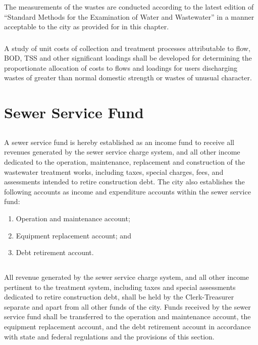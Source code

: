 \subsubsection{}
The measurements of the wastes are conducted according to the latest edition of “Standard Methods for the Examination of Water and Wastewater” in a manner acceptable to the city as provided for in this chapter.
\subsubsection{}
A study of unit costs of collection and treatment processes attributable to flow, BOD, TSS and other significant loadings shall be developed for determining the proportionate allocation of costs to flows and loadings for users discharging wastes of greater than normal domestic strength or wastes of unusual character.

\section{Sewer Service Fund}
\subsection{}
A sewer service fund is hereby established as an income fund to receive all revenues generated by the sewer service charge system, and all other income dedicated to the operation, maintenance, replacement and construction of the wastewater treatment works, including taxes, special charges, fees, and assessments intended to retire construction debt.  The city also establishes the following accounts as income and expenditure accounts within the sewer service fund:
\begin{enumerate}
\item Operation and maintenance account;
\item Equipment replacement account; and
\item Debt retirement account.
\end{enumerate}
\subsection{}
All revenue generated by the sewer service charge system, and all other income pertinent to the treatment system, including taxes and special assessments dedicated to retire construction debt, shall be held by the Clerk-Treasurer separate and apart from all other funds of the city.  Funds received by the sewer service fund shall be transferred to the operation and maintenance account, the equipment replacement account, and the debt retirement account in accordance with state and federal regulations and the provisions of this section.
